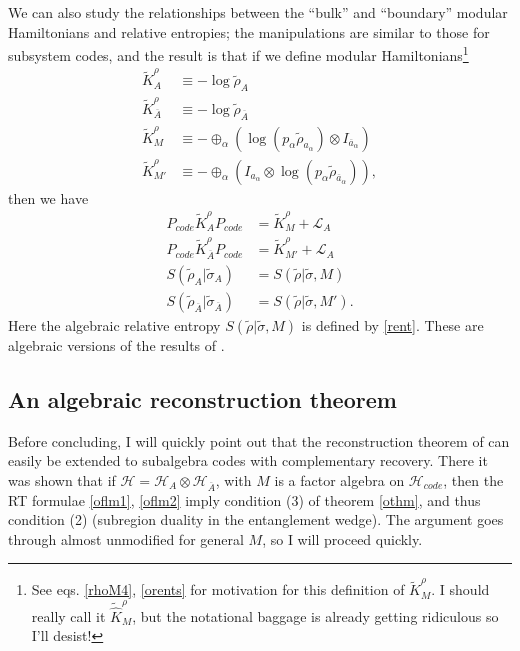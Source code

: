 \documentclass[12pt]{article}
\newcommand{\wt}{\widetilde}
\newcommand{\Ll}{\mathcal{L}}
\newcommand{\Hh}{\mathcal{H}}
\newcommand{\HA}{\mathcal{H}_A}
\newcommand{\HAb}{\mathcal{H}_{\ol{A}}}
\newcommand{\Ab}{\ol{A}}
\newcommand{\ab}{\ol{a}}
\newcommand{\Hc}{\mathcal{H}_{code}}
\newcommand{\LA}{\Ll_A}
\newcommand{\ol}{\overline}
\newcommand{\Pc}{P_{code}}
\begin{document}
We can also study the relationships between the ``bulk'' and ``boundary'' modular Hamiltonians and relative entropies; the manipulations are similar to those for subsystem codes, and the result is that if we define modular Hamiltonians\footnote{See eqs. \eqref{rhoM4}, \eqref{orents} for motivation for this definition of $\wt{K}^\rho_M$.  I should really call it $\wt{\hat{K}}^\rho_M$, but the notational baggage is already getting ridiculous so I'll desist!}  
\begin{align}
\wt{K}^\rho_A&\equiv -\log \wt{\rho}_A\\
\wt{K}^\rho_{\Ab}&\equiv -\log \wt{\rho}_{\Ab}\\
\wt{K}^\rho_M&\equiv -\oplus_\alpha \left(\log(p_\alpha \wt{\rho}_{a_\alpha})\otimes I_{\ab_\alpha}\right)\\
\wt{K}^\rho_{M'}&\equiv -\oplus_\alpha \left(I_{a_\alpha}\otimes\log(p_\alpha \wt{\rho}_{\ab_\alpha})\right),
\end{align}
then we have
\begin{align}\label{ojlms}
\Pc \wt{K}^\rho_A\Pc&=\wt{K}^\rho_M+\LA\\\label{ojlms1}
\Pc \wt{K}^\rho_{\Ab} \Pc&=\wt{K}^\rho_{M'}+\LA\\\label{ojlms2}
S(\wt{\rho}_A|\wt{\sigma}_A)&=S(\wt{\rho}|\wt{\sigma},M)\\
S(\wt{\rho}_{\Ab}|\wt{\sigma}_{\Ab})&=S(\wt{\rho}|\wt{\sigma},M').\label{ojlms3}
\end{align}
Here the algebraic relative entropy $S(\wt{\rho}|\wt{\sigma},M)$ is defined by \eqref{rent}.  These are algebraic versions of the results of \cite{Jafferis:2015del}.

\subsection{An algebraic reconstruction theorem}
Before concluding, I will quickly point out that the reconstruction theorem of \cite{Dong:2016eik} can easily be extended to subalgebra codes with complementary recovery.  There it was shown that if $\Hh=\HA\otimes\HAb$, with $M$ is a factor algebra on $\Hc$, then the RT formulae \eqref{oflm1}, \eqref{oflm2} imply condition (3) of theorem \ref{othm}, and thus condition (2) (subregion duality in the entanglement wedge).  The argument goes through almost unmodified for general $M$, so I will proceed quickly.  
\end{document}
